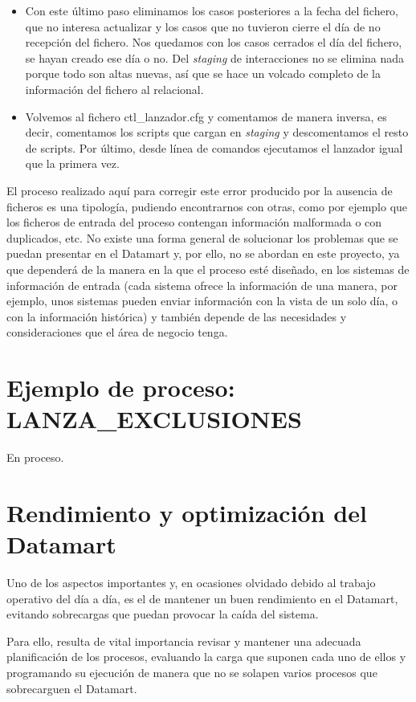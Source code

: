 \documentclass[a4paper, 12pt]{book}
\begin{document}
\begin{enumerate}
\begin{itemize}
	\item Con este último paso eliminamos los casos posteriores a la fecha del fichero, que no interesa actualizar y los casos que no tuvieron cierre el día de no recepción del fichero. Nos quedamos con los casos cerrados el día del fichero, se hayan creado ese día o no. Del \textit{staging} de interacciones no se elimina nada porque todo son altas nuevas, así que se hace un volcado completo de la información del fichero al relacional.
	
	\item Volvemos al fichero ctl\_lanzador.cfg y comentamos de manera inversa, es decir, comentamos los scripts que cargan en \textit{staging} y descomentamos el resto de scripts. Por último, desde línea de comandos ejecutamos el lanzador igual que la primera vez.
\end{itemize}
El proceso realizado aquí para corregir este error producido por la ausencia de ficheros es una tipología, pudiendo encontrarnos con otras, como por ejemplo que los ficheros de entrada del proceso contengan información malformada o con duplicados, etc. No existe una forma general de solucionar los problemas que se puedan presentar en el Datamart y, por ello, no se abordan en este proyecto, ya que dependerá de la manera en la que el proceso esté diseñado, en los sistemas de información de entrada (cada sistema ofrece la información de una manera, por ejemplo, unos sistemas pueden enviar información con la vista de un solo día, o con la información histórica) y también depende de las necesidades y consideraciones que el área de negocio tenga. 
\end{enumerate}

\section{Ejemplo de proceso: LANZA\_EXCLUSIONES} 
\label{sec:lanza_exclusiones}
En proceso.


\section{Rendimiento y optimización del Datamart} 
\label{sec:rendimiento}
Uno de los aspectos importantes y, en ocasiones olvidado debido al trabajo operativo del día a día, es el de mantener un buen rendimiento en el Datamart, evitando sobrecargas que puedan provocar la caída del sistema.

Para ello, resulta de vital importancia revisar y mantener una adecuada planificación de los procesos, evaluando la carga que suponen cada uno de ellos y programando su ejecución de manera que no se solapen varios procesos que sobrecarguen el Datamart.
\end{document}
